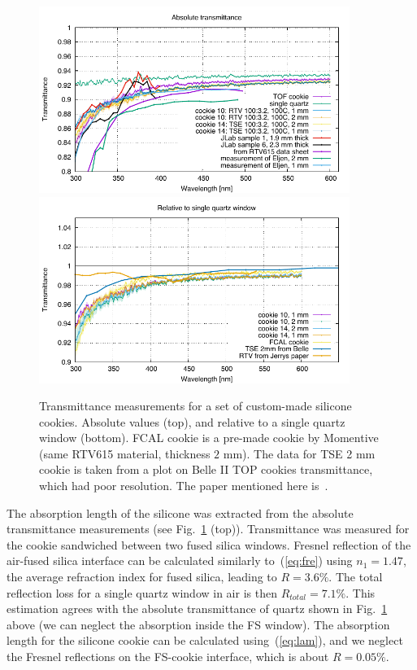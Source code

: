 \begin{figure}[!tb]
\centering
\includegraphics[angle=0,width=0.9\textwidth]{pics/transmittance1.pdf} \\
\includegraphics[angle=0,width=0.9\textwidth]{pics/cookie10_relQuartz.pdf}
\caption{\label{pic:coo}
Transmittance measurements for a set of custom-made silicone cookies. Absolute values (top), and relative to a single quartz window  (bottom). FCAL cookie is a pre-made cookie by Momentive (same RTV615 material, thickness $2$ mm). The data for TSE 2 mm cookie is taken from a plot on Belle II TOP cookies transmittance, which had poor resolution. The paper mentioned here is~\cite{slacpub}.
}
\end{figure}

The absorption length of the silicone was extracted from the absolute transmittance measurements (see Fig.~\ref{pic:coo} (top)). Transmittance was measured for the cookie sandwiched between two fused silica windows. Fresnel reflection of the air-fused silica interface can be calculated similarly to~(\ref{eq:fre}) using $n_1 = 1.47$, the average refraction index for fused silica, leading to $R = 3.6 \%$. The total reflection loss for a single quartz window in air is then $R_{total} = 7.1 \%$. This estimation agrees with the absolute transmittance of quartz shown in Fig.~\ref{pic:coo} above (we can neglect the absorption inside the FS window). The absorption length for the silicone cookie can be calculated using~(\ref{eq:lam}), and we neglect the Fresnel reflections on the FS-cookie interface, which is about $R = 0.05 \%$.

